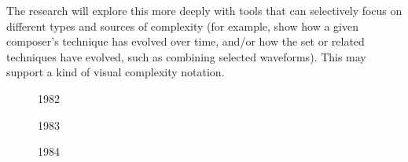 \documentclass[10pt]{article}
\begin{document}
\begin{multicols*}{2}
The research will explore this more deeply with tools that can selectively focus on different types and sources of complexity (for example, show how a given composer’s technique has evolved over time, and/or how the set or related techniques have evolved, such as combining selected waveforms). This may support a kind of visual complexity notation.

\begin{figure}
\noindent{}
\caption{1982}
\end{figure}

\begin{figure}
\noindent{}
\caption{1983}
\end{figure}

\begin{figure}
\noindent{}
\caption{1984}
\end{figure}


\end{multicols*}
\end{document}
